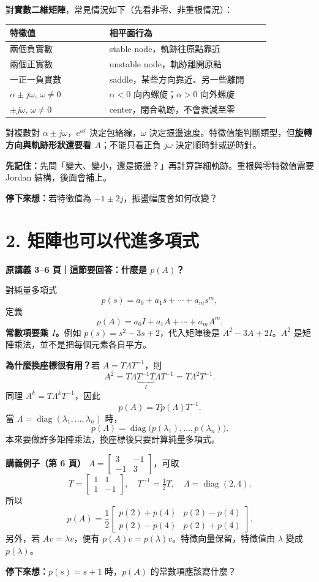 \documentclass[12pt,a4paper]{article}
\newcommand{\topic}[3]{\clearpage\section*{#1}\textcolor{accent}{\textbf{原講義 #2 頁｜這節要回答：#3}}\par}
\newcommand{\key}[1]{\par\textcolor{accent}{\textbf{先記住：}}#1\par}
\newcommand{\checkq}[1]{\par\textbf{停下來想：}#1\par}
\DeclareMathOperator{\diag}{diag}
\begin{document}
對\textbf{實數二維矩陣}，常見情況如下（先看非零、非重根情況）：
\begin{center}\small
\begin{tabular}{p{0.34\linewidth}p{0.55\linewidth}}
\toprule 特徵值 & 相平面行為\\\midrule
兩個負實數 & stable node，軌跡往原點靠近\\
兩個正實數 & unstable node，軌跡離開原點\\
一正一負實數 & saddle，某些方向靠近、另一些離開\\
$\alpha\pm j\omega$, $\omega\ne0$ & $\alpha<0$ 向內螺旋；$\alpha>0$ 向外螺旋\\
$\pm j\omega$, $\omega\ne0$ & center，閉合軌跡，不會衰減至零\\\bottomrule
\end{tabular}
\end{center}
對複數對 $\alpha\pm j\omega$，$e^{\alpha t}$ 決定包絡線，$\omega$ 決定振盪速度。特徵值能判斷類型，但\textbf{旋轉方向與軌跡形狀還要看 $A$}；不能只看正負 $j\omega$ 決定順時針或逆時針。

\key{先問「變大、變小，還是振盪？」再計算詳細軌跡。重根與零特徵值需要 Jordan 結構，後面會補上。}
\checkq{若特徵值為 $-1\pm 2j$，振盪幅度會如何改變？}

\topic{2. 矩陣也可以代進多項式}{3--6}{什麼是 $p(A)$？}
對純量多項式
\[
 p(s)=a_0+a_1s+\cdots+a_ms^m,
\]
定義
\[
\boxed{p(A)=a_0I+a_1A+\cdots+a_mA^m.}
\]
\textbf{常數項要乘 $I$。}例如 $p(s)=s^2-3s+2$，代入矩陣後是 $A^2-3A+2I$。$A^2$ 是矩陣乘法，並不是把每個元素各自平方。

\textbf{為什麼換座標很有用？}\quad 若 $A=T\Lambda T^{-1}$，則
\[
 A^2=T\Lambda\underbrace{T^{-1}T}_{I}\Lambda T^{-1}=T\Lambda^2T^{-1}.
\]
同理 $A^k=T\Lambda^kT^{-1}$，因此
\[
\boxed{p(A)=Tp(\Lambda)T^{-1}.}
\]
當 $\Lambda=\diag(\lambda_1,\ldots,\lambda_n)$ 時，
\[
 p(\Lambda)=\diag\bigl(p(\lambda_1),\ldots,p(\lambda_n)\bigr).
\]
本來要做許多矩陣乘法，換座標後只要計算純量多項式。

\textbf{講義例子（第 6 頁）}\quad
$A=\begin{bmatrix}3&-1\\-1&3\end{bmatrix}$，可取
\[
 T=\begin{bmatrix}1&1\\1&-1\end{bmatrix},\quad
 T^{-1}=\tfrac12T,\quad \Lambda=\diag(2,4).
\]
所以
\[
 p(A)=\frac12\begin{bmatrix}
 p(2)+p(4)&p(2)-p(4)\\p(2)-p(4)&p(2)+p(4)
 \end{bmatrix}.
\]
另外，若 $Av=\lambda v$，便有 $p(A)v=p(\lambda)v$。特徵向量保留，特徵值由 $\lambda$ 變成 $p(\lambda)$。
\checkq{$p(s)=s+1$ 時，$p(A)$ 的常數項應該寫什麼？}
\end{document}
